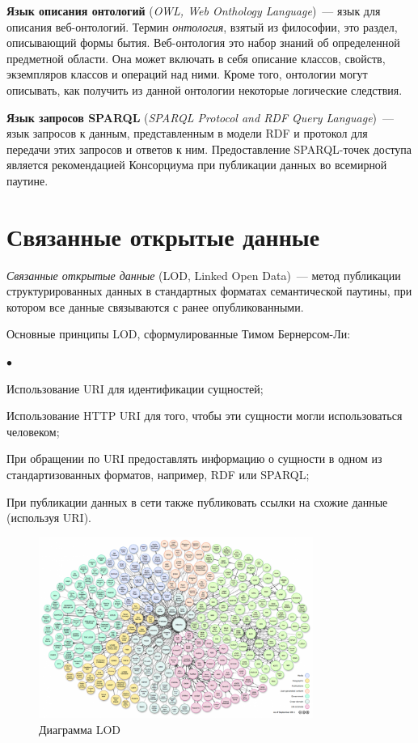 \documentclass[oneside, a4paper, final, 14 pt]{extarticle}
\newenvironment{compactlist} {
  \begin{list}{{$\bullet$}} {
    \setlength\partopsep{0pt}
    \setlength\parskip{0pt}
    \setlength\parsep{0pt}
    \setlength\topsep{0pt}
    \setlength\itemsep{0pt}
  }
}{
  \end{list}
  \smallskip
}
\begin{document}
\textbf{Язык описания онтологий} \cite{owl} (\emph{OWL, Web Onthology Language})~--- язык для описания
веб-онтологий. Термин \emph{онтология}, взятый из философии, это раздел, описывающий формы бытия.
Веб-онтология это набор знаний об определенной предметной области. Она может включать в себя описание
классов, свойств, экземпляров классов и операций над ними. Кроме того, онтологии могут описывать,
как получить из данной онтологии некоторые логические следствия.

\textbf{Язык запросов SPARQL} \cite{sparql} (\emph{SPARQL Protocol and RDF Query Language})~--- язык
запросов к данным, представленным в модели RDF и протокол для передачи этих запросов и ответов к ним.
Предоставление SPARQL-точек доступа является рекомендацией Консорциума при публикации данных во
всемирной паутине.

\bigskip
\section{Связанные открытые данные}

\emph{Связанные открытые данные} \cite{lod} (LOD, Linked Open Data)~--- метод публикации структурированных 
данных в стандартных форматах семантической паутины, при котором все данные связываются с ранее 
опубликованными. 

Основные принципы LOD, сформулированные Тимом Бернерсом-Ли:
\begin{compactlist}
  \item Использование URI для идентификации сущностей;
  \item Использование HTTP URI для того, чтобы эти сущности могли использоваться человеком;
  \item При обращении по URI предоставлять информацию о сущности в одном из стандартизованных 
  форматов, например, RDF или SPARQL;
  \item При публикации данных в сети также публиковать ссылки на схожие данные (используя URI).
\end{compactlist}
\begin{figure}
  \centering
  \includegraphics[width=0.8\textwidth]{cloud12.png}
  \caption{Диаграмма LOD}
  \label{lod:datasets}
\end{figure}
\end{document}
